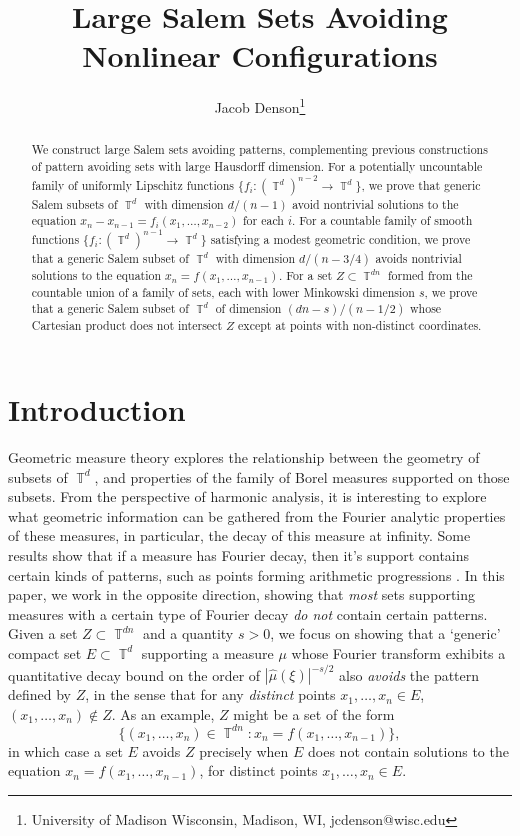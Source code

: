 \documentclass[dvipsnames,letterpaper,12pt]{article}
\title{Large Salem Sets Avoiding Nonlinear Configurations}
\author{Jacob Denson\footnote{University of Madison Wisconsin, Madison, WI, jcdenson@wisc.edu}}
\numberwithin{equation}{section}
\DeclareMathOperator{\TT}{\mathbb{T}}
\numberwithin{theorem}{section}
\begin{document}
\maketitle

\begin{abstract}
    We construct large Salem sets avoiding patterns, complementing previous constructions of pattern avoiding sets with large Hausdorff dimension. For a potentially uncountable family of uniformly Lipschitz functions $\{ f_i : (\TT^d)^{n-2} \to \TT^d \}$, we prove that generic Salem subsets of $\TT^d$ with dimension $d/(n-1)$ avoid nontrivial solutions to the equation $x_n - x_{n-1} = f_i(x_1,\dots,x_{n-2})$ for each $i$. For a countable family of smooth functions $\{ f_i : (\TT^d)^{n-1} \to \TT^d \}$ satisfying a modest geometric condition, we prove that a generic Salem subset of $\TT^d$ with dimension $d/(n-3/4)$ avoids nontrivial solutions to the equation $x_n = f(x_1,\dots,x_{n-1})$. For a set $Z \subset \TT^{dn}$ formed from the countable union of a family of sets, each with lower Minkowski dimension $s$, we prove that a generic Salem subset of $\TT^d$ of dimension $(dn - s)/(n - 1/2)$ whose Cartesian product does not intersect $Z$ except at points with non-distinct coordinates.
\end{abstract}

\section{Introduction}

Geometric measure theory explores the relationship between the geometry of subsets of $\TT^d$, and properties of the family of Borel measures supported on those subsets. From the perspective of harmonic analysis, it is interesting to explore what geometric information can be gathered from the Fourier analytic properties of these measures, in particular, the decay of this measure at infinity. Some results show that if a measure has Fourier decay, then it's support contains certain kinds of patterns, such as points forming arithmetic progressions \cite{LabaPramanik,ChanLabaPramanik, HenriotLabaPramanik}. In this paper, we work in the opposite direction, showing that \emph{most} sets supporting measures with a certain type of Fourier decay \emph{do not} contain certain patterns. Given a set $Z \subset \TT^{dn}$ and a quantity $s > 0$, we focus on showing that a `generic' compact set $E \subset \TT^d$ supporting a measure $\mu$ whose Fourier transform exhibits a quantitative decay bound on the order of $|\widehat{\mu}(\xi)|^{-s/2}$ also \emph{avoids} the pattern defined by $Z$, in the sense that for any \emph{distinct} points $x_1,\dots,x_n \in E$, $(x_1,\dots,x_n) \not \in Z$. As an example, $Z$ might be a set of the form
%
\[ \{ (x_1,\dots,x_n) \in \TT^{dn}: x_n = f(x_1,\dots,x_{n-1}) \}, \]
%
in which case a set $E$ avoids $Z$ precisely when $E$ does not contain solutions to the equation $x_n = f(x_1,\dots,x_{n-1})$, for distinct points $x_1,\dots,x_n \in E$.
\end{document}
